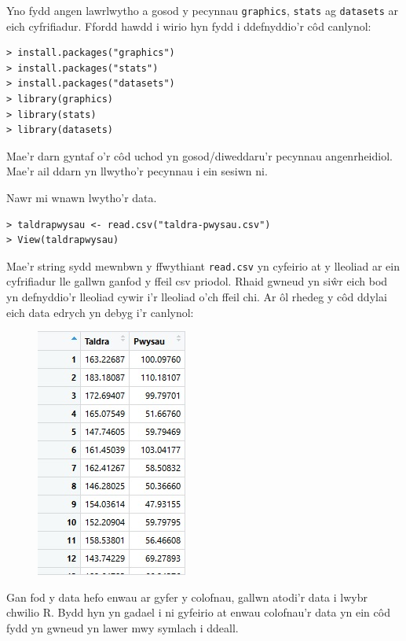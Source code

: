 Yno fydd angen lawrlwytho a gosod y pecynnau \texttt{graphics}, \texttt{stats} ag \texttt{datasets} ar eich cyfrifiadur. Ffordd hawdd i wirio hyn fydd i ddefnyddio'r c\^{o}d canlynol: 

\begin{verbatim}
> install.packages("graphics")
> install.packages("stats")
> install.packages("datasets")
> library(graphics)
> library(stats)
> library(datasets)
\end{verbatim}

Mae'r darn gyntaf o'r c\^{o}d uchod yn gosod/diweddaru'r pecynnau angenrheidiol. Mae'r ail ddarn yn llwytho'r pecynnau i ein sesiwn ni.

Nawr mi wnawn lwytho'r data.

\begin{verbatim}
> taldrapwysau <- read.csv("taldra-pwysau.csv")
> View(taldrapwysau)
\end{verbatim}

Mae'r string sydd mewnbwn y ffwythiant \texttt{read.csv} yn cyfeirio at y lleoliad ar ein cyfrifiadur lle gallwn ganfod y ffeil csv priodol. Rhaid gwneud yn si\^{w}r eich bod yn defnyddio'r lleoliad cywir i'r lleoliad o'ch ffeil chi.
Ar \^{o}l rhedeg y c\^{o}d ddylai eich data edrych yn debyg i'r canlynol: 

\begin{figure}[H]
\begin{center}
\includegraphics[width=0.35\linewidth]{../img/Data_yn_R.jpg}
\end{center}
\label{fig:DataR}
\end{figure}

Gan fod y data hefo enwau ar gyfer y colofnau, gallwn atodi'r data i lwybr chwilio R. Bydd hyn yn gadael i ni gyfeirio at enwau colofnau'r data yn ein c\^{o}d fydd yn gwneud yn lawer mwy symlach i ddeall.

